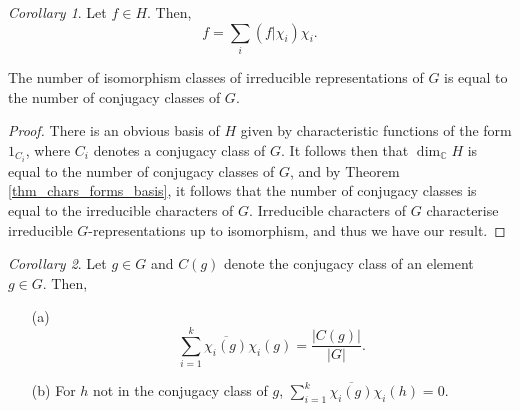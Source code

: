 \documentclass[a4paper]{report}
\theoremstyle{definition}
\theoremstyle{remark}
\theoremstyle{proposition}
\theoremstyle{conjecture}
\theoremstyle{lemma}
\theoremstyle{corollary}
\newtheorem{corollary}{Corollary}
\theoremstyle{exercise}
\theoremstyle{example}
\newcommand{\C}{\mathbb{C}}
\begin{document}
\begin{corollary}\label{cor_class_func_decomp}
    Let $f \in H$. Then, 
    $$f = \sum_i (f\vert \chi_i) \chi_i.$$
\end{corollary}

\begin{theorem}
    The number of isomorphism classes of irreducible representations of $G$ is 
    equal to the number of conjugacy classes of $G$.
\end{theorem}

\begin{proof}
    There is an obvious basis of $H$ given by characteristic functions 
    of the form $1_{C_i}$, where $C_i$ denotes a conjugacy class of $G$.
    It follows then that $\dim_\C H$ is equal to the number of 
    conjugacy classes of $G$, and by Theorem \ref{thm_chars_forms_basis}, 
    it follows that the number of conjugacy classes is equal to the irreducible
    characters of $G$. Irreducible characters of $G$ characterise irreducible
    $G$-representations up to isomorphism, and thus we have our result.
\end{proof}

\begin{corollary}\label{cor_cor8}
    Let $g \in G$ and $C(g)$ denote the conjugacy class of an element $g\in G$.
    Then, 
    \begin{itemize}
        \item[(a)] $$\sum_{i=1}^k \overline{\chi_i(g)}\chi_i(g) =\frac{\vert C(g)\vert}{\vert G\vert}.$$
        \item[(b)] For $h$ not in the conjugacy class of $g$,
            $\sum_{i=1}^k \overline{\chi_i(g)}\chi_i(h) = 0$.
    \end{itemize}
\end{corollary}
\end{document}
